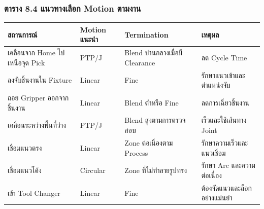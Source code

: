 \subsubsection{ตาราง 8.4 แนวทางเลือก Motion ตามงาน}

\begin{table}[htbp]
    \centering
    \begin{tabular}{l l l l}
        \hline
        \textbf{สถานการณ์} & \textbf{Motion แนะนำ} & \textbf{Termination} & \textbf{เหตุผล} \\
        \hline
        เคลื่อนจาก Home ไปเหนือจุด Pick & PTP/J & Blend ปานกลางเมื่อมี Clearance & ลด Cycle Time \\
        ลงจับชิ้นงานใน Fixture & Linear & Fine & รักษาแนวเข้าและตำแหน่งจับ \\
        ถอย Gripper ออกจากชิ้นงาน & Linear & Blend ต่ำหรือ Fine & ลดการเฉี่ยวชิ้นงาน \\
        เคลื่อนระหว่างพื้นที่ว่าง & PTP/J & Blend สูงตามการตรวจสอบ & เร็วและใช้เส้นทาง Joint \\
        เชื่อมแนวตรง & Linear & Zone ต่อเนื่องตาม Process & รักษาความเร็วและแนวเชื่อม \\
        เชื่อมแนวโค้ง & Circular & Zone ที่ไม่ทำลายรูปทรง & รักษา Arc และความต่อเนื่อง \\
        เข้า Tool Changer & Linear & Fine & ต้องจัดแนวและล็อกอย่างแม่นยำ \\
        \hline
    \end{tabular}
\end{table}



